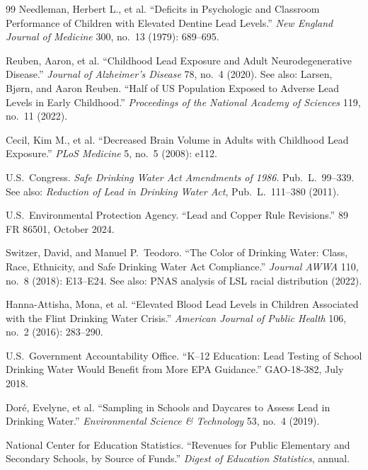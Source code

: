 \documentclass[12pt,openany]{book}
\begin{document}
\begin{thebibliography}{99}
Needleman, Herbert L., et al. ``Deficits in Psychologic and Classroom Performance of Children with Elevated Dentine Lead Levels.'' \textit{New England Journal of Medicine} 300, no.\ 13 (1979): 689--695.

Reuben, Aaron, et al. ``Childhood Lead Exposure and Adult Neurodegenerative Disease.'' \textit{Journal of Alzheimer's Disease} 78, no.\ 4 (2020). See also: Larsen, Bj\o rn, and Aaron Reuben. ``Half of US Population Exposed to Adverse Lead Levels in Early Childhood.'' \textit{Proceedings of the National Academy of Sciences} 119, no.\ 11 (2022).

Cecil, Kim M., et al. ``Decreased Brain Volume in Adults with Childhood Lead Exposure.'' \textit{PLoS Medicine} 5, no.\ 5 (2008): e112.


U.S.\ Congress. \textit{Safe Drinking Water Act Amendments of 1986}. Pub.\ L.\ 99--339. See also: \textit{Reduction of Lead in Drinking Water Act}, Pub.\ L.\ 111--380 (2011).

U.S.\ Environmental Protection Agency. ``Lead and Copper Rule Revisions.'' 89 FR 86501, October 2024.

Switzer, David, and Manuel P.\ Teodoro. ``The Color of Drinking Water: Class, Race, Ethnicity, and Safe Drinking Water Act Compliance.'' \textit{Journal AWWA} 110, no.\ 8 (2018): E13--E24. See also: PNAS analysis of LSL racial distribution (2022).

Hanna-Attisha, Mona, et al. ``Elevated Blood Lead Levels in Children Associated with the Flint Drinking Water Crisis.'' \textit{American Journal of Public Health} 106, no.\ 2 (2016): 283--290.

U.S.\ Government Accountability Office. ``K--12 Education: Lead Testing of School Drinking Water Would Benefit from More EPA Guidance.'' GAO-18-382, July 2018.

Dor\'{e}, Evelyne, et al. ``Sampling in Schools and Daycares to Assess Lead in Drinking Water.'' \textit{Environmental Science \& Technology} 53, no.\ 4 (2019).

National Center for Education Statistics. ``Revenues for Public Elementary and Secondary Schools, by Source of Funds.'' \textit{Digest of Education Statistics}, annual.


\end{thebibliography}
\end{document}
